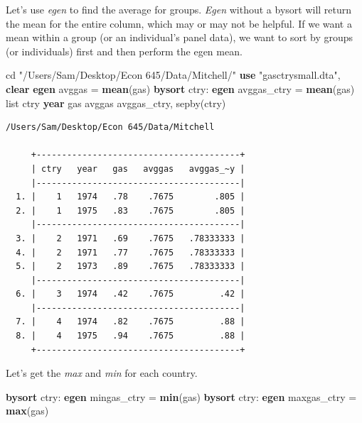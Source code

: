 \documentclass[
]{book}
\newenvironment{Shaded}{\begin{snugshade}}{\end{snugshade}}
\newcommand{\FunctionTok}[1]{\textcolor[rgb]{0.13,0.29,0.53}{\textbf{#1}}}
\newcommand{\KeywordTok}[1]{\textcolor[rgb]{0.13,0.29,0.53}{\textbf{#1}}}
\newcommand{\NormalTok}[1]{#1}
\newcommand{\OtherTok}[1]{\textcolor[rgb]{0.56,0.35,0.01}{#1}}
\newcommand{\StringTok}[1]{\textcolor[rgb]{0.31,0.60,0.02}{#1}}
\begin{document}
Let's use \emph{egen} to find the average for groups. \emph{Egen} without a bysort will return the mean for the entire column, which may or may not be helpful. If we want a mean within a group (or an individual's panel data), we want to sort by groups (or individuals) first and then perform the egen mean.

\begin{Shaded}
\begin{Highlighting}[]
\NormalTok{cd }\StringTok{"/Users/Sam/Desktop/Econ 645/Data/Mitchell/"}
\KeywordTok{use} \StringTok{"gasctrysmall.dta"}\NormalTok{, }\KeywordTok{clear}
\KeywordTok{egen}\NormalTok{ avggas = }\KeywordTok{mean}\NormalTok{(gas)}
\KeywordTok{bysort}\NormalTok{ ctry: }\KeywordTok{egen}\NormalTok{ avggas\_ctry = }\KeywordTok{mean}\NormalTok{(gas)}
\OtherTok{list}\NormalTok{ ctry }\FunctionTok{year}\NormalTok{ gas avggas avggas\_ctry, sepby(ctry)}
\end{Highlighting}
\end{Shaded}

\begin{verbatim}
/Users/Sam/Desktop/Econ 645/Data/Mitchell

     +----------------------------------------+
     | ctry   year   gas   avggas   avggas_~y |
     |----------------------------------------|
  1. |    1   1974   .78    .7675        .805 |
  2. |    1   1975   .83    .7675        .805 |
     |----------------------------------------|
  3. |    2   1971   .69    .7675   .78333333 |
  4. |    2   1971   .77    .7675   .78333333 |
  5. |    2   1973   .89    .7675   .78333333 |
     |----------------------------------------|
  6. |    3   1974   .42    .7675         .42 |
     |----------------------------------------|
  7. |    4   1974   .82    .7675         .88 |
  8. |    4   1975   .94    .7675         .88 |
     +----------------------------------------+
\end{verbatim}

Let's get the \emph{max} and \emph{min} for each country.

\begin{Shaded}
\begin{Highlighting}[]
\KeywordTok{bysort}\NormalTok{ ctry: }\KeywordTok{egen}\NormalTok{ mingas\_ctry = }\FunctionTok{min}\NormalTok{(gas)}
\KeywordTok{bysort}\NormalTok{ ctry: }\KeywordTok{egen}\NormalTok{ maxgas\_ctry = }\FunctionTok{max}\NormalTok{(gas)}
\end{Highlighting}
\end{Shaded}
\end{document}
